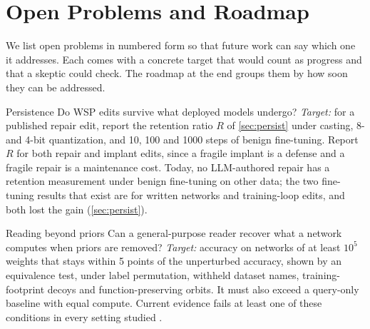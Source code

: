 \section{Open Problems and Roadmap}
\label{sec:open}

We list open problems in numbered form so that future work can say which one it addresses. Each comes with a concrete target that would count as progress and that a skeptic could check. The roadmap at the end groups them by how soon they can be addressed.

\begin{openproblem}{Persistence}\label{op:persist}
Do WSP edits survive what deployed models undergo? \emph{Target:} for a published repair edit, report the retention ratio $R$ of \cref{sec:persist} under casting, 8- and 4-bit quantization, and 10, 100 and 1000 steps of benign fine-tuning. Report $R$ for both repair and implant edits, since a fragile implant is a defense and a fragile repair is a maintenance cost. Today, no LLM-authored repair has a retention measurement under benign fine-tuning on other data; the two fine-tuning results that exist are for written networks and training-loop edits, and both lost the gain (\cref{sec:persist}).
\end{openproblem}

\begin{openproblem}{Reading beyond priors}\label{op:read}
Can a general-purpose reader recover what a network computes when priors are removed? \emph{Target:} accuracy on networks of at least $10^{5}$ weights that stays within 5 points of the unperturbed accuracy, shown by an equivalence test, under label permutation, withheld dataset names, training-footprint decoys and function-preserving orbits. It must also exceed a query-only baseline with equal compute. Current evidence fails at least one of these conditions in every setting studied \citep{ax2611_08070,zen24373915,ax2611_05798,ax2611_07847}.
\end{openproblem}

